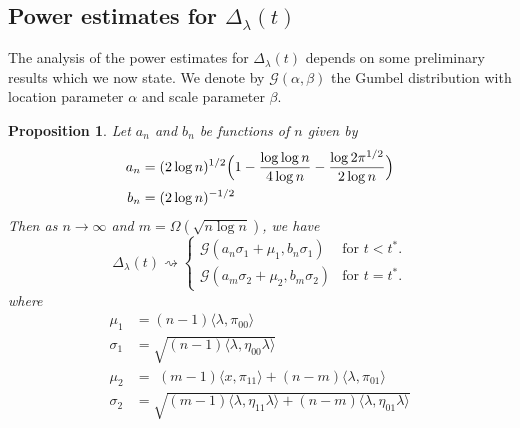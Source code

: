 \documentclass[draftcls]{IEEEtran}
\newtheorem{proposition}[theorem]{Proposition}
\theoremstyle{definition}
\begin{document}
\subsection{Power estimates for $\Delta_{\lambda}(t)$}
The analysis of the power estimates for $\Delta_{\lambda}(t)$ depends
on some preliminary results which we now state. We denote by
$\mathcal{G}(\alpha, \beta)$ the Gumbel distribution with location
parameter $\alpha$ and scale parameter $\beta$.  
\begin{proposition}
  \label{prop:3}
  Let $a_n$ and $b_n$ be functions of $n$ given by
  \begin{align*}
    a_n &= (2 \log{n})^{1/2}\Bigl(1 - \frac{\log{\log{n}}}{4 \log{n}} -
    \frac{\log{2\pi^{1/2}}}{2 \log{n}} \Bigr) \\ 
    b_n &= (2 \log{n})^{-1/2}
  \end{align*}
  Then as $n \rightarrow \infty$ and $m = \Omega( \sqrt{n \log{n}})$,
  we have
  \begin{equation}
    \label{eq:14}
    \Delta_{\lambda}(t) \rightsquigarrow \begin{cases}
      \mathcal{G}(a_n \sigma_1 + \mu_1, b_n \sigma_1 ) & \text{for $t < t^{*}$.} \\
     \mathcal{G}(a_m \sigma_2 + \mu_2, b_m \sigma_2) &
     \text{for $t = t^{*}$.}
     \end{cases}
  \end{equation}
  where
  \begin{align*}
    \mu_1 &= (n-1)\langle \lambda, \pi_{00} \rangle \\
    \sigma_1 &= \sqrt{(n-1)\langle \lambda, \eta_{00} \lambda \rangle} \\
    \mu_2 &= \,\, (m - 1) \langle x, \pi_{11} \rangle + (n-
    m)\langle \lambda, \pi_{01} \rangle
    \\ \sigma_2 &= \sqrt{ (m - 1) \langle \lambda, \eta_{11} \lambda \rangle + (n -
      m) \langle \lambda, \eta_{01} \lambda \rangle}
    \end{align*}
\end{proposition}
\end{document}
